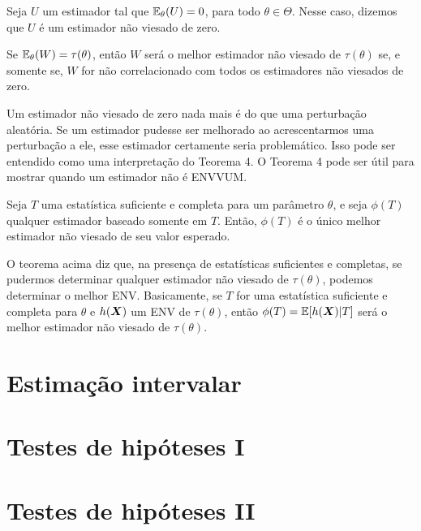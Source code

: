\begin{definition}
	Seja $U$ um estimador tal que $\operatorname{\mathbb{E}}_\theta(U) = 0$, para todo $\theta \in \Theta$. Nesse caso, dizemos que $U$ é um estimador não viesado de zero.
\end{definition}

\begin{theorem}[Teorema 4]
	Se $\operatorname{\mathbb{E}}_\theta(W) = \tau(\theta)$, então $W$ será o melhor estimador não viesado de $\tau(\theta)$ se, e somente se, $W$ for não correlacionado com todos os estimadores não viesados de zero.
	
	\begin{note}
		Um estimador não viesado de zero nada mais é do que uma perturbação aleatória. Se um estimador pudesse ser melhorado ao acrescentarmos uma perturbação a ele, esse estimador certamente seria problemático. Isso pode ser entendido como uma interpretação do Teorema 4. O Teorema 4 pode ser útil para mostrar quando um estimador não é ENVVUM.
	\end{note}
\end{theorem}

\begin{theorem}[Teorema 5]
	Seja $T$ uma estatística suficiente e completa para um parâmetro $\theta$, e seja $\phi(T)$ qualquer estimador baseado somente em $T$. Então, $\phi(T)$ é o único melhor estimador não viesado de seu valor esperado.
	
	\begin{note}
		O teorema acima diz que, na presença de estatísticas suficientes e completas, se pudermos determinar qualquer estimador não viesado de $\tau(\theta)$, podemos determinar o melhor ENV. Basicamente, se $T$ for uma estatística suficiente e completa para $\theta$ e $h(\bm{X})$ um ENV de $\tau(\theta)$, então $\phi(T) = \operatorname{\mathbb{E}}[h(\bm{X}) | T]$ será o melhor estimador não viesado de $\tau(\theta)$.
	\end{note}
\end{theorem}

\section{Estimação intervalar}


\section{Testes de hipóteses I}


\section{Testes de hipóteses II}

